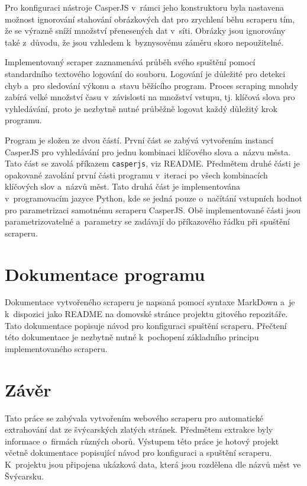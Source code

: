 \documentclass[11pt,a4paper]{article}
\begin{document}
Pro konfiguraci nástroje CasperJS v~rámci jeho konstruktoru byla nastavena možnost ignorování stahování obrázkových dat pro zrychlení běhu scraperu tím, že se výrazně sníží množství přenesených dat v~síti. Obrázky jsou ignorovány také z~důvodu, že jsou vzhledem k~byznysovému záměru skoro nepoužitelné.

Implementovaný scraper zaznamenává průběh svého spuštění pomocí standardního textového logování do souboru. Logování je důležité pro detekci chyb a~pro sledování výkonu a~stavu běžícího program. Proces scraping mnohdy zabírá velké množství času v~závislosti na množství vstupu, tj. klíčová slova pro vyhledávání, proto je nezbytně nutné průběžně logovat každý důležitý krok programu.

Program je složen ze dvou částí. První část se zabývá vytvořením instancí CasperJS pro vyhledávání pro jednu kombinaci klíčového slova a~názvu města. Tato část se zavolá příkazem \texttt{casperjs}, viz README. Předmětem druhé části je opakované zavolání první části programu v~iteraci po všech kombinacích klíčových slov a~názvů měst. Tato druhá část je implementována v~programovacím jazyce Python, kde se jedná pouze o~načítání vstupních hodnot pro parametrizaci samotnému scraperu CasperJS. Obě implementované části jsou parametrizovatelné a~parametry se zadávají do příkazového řádku při spuštění scraperu.


\section{Dokumentace programu}
Dokumentace vytvořeného scraperu je napsaná pomocí syntaxe MarkDown a~je k~dispozici jako README na domovské stránce projektu gitového repozitáře. Tato dokumentace popisuje návod pro konfiguraci spuštění scraperu. Přečtení této dokumentace je nezbytně nutné k~pochopení základního principu implementovaného scraperu.


\section*{Závěr}
Tato práce se zabývala vytvořením webového scraperu pro automatické extrahování dat ze švýcarských zlatých stránek. Předmětem extrakce byly informace o~firmách různých oborů. Výstupem této práce je hotový projekt včetně dokumentace popisující návod pro konfiguraci a spuštění scraperu. K~projektu jsou připojena ukázková data, která jsou rozdělena dle názvů měst ve Švýcarsku.
\end{document}
